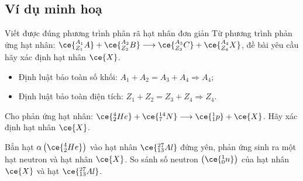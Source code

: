 \subsection{Ví dụ minh hoạ}
\begin{dang}{Viết được đúng phương trình phân rã hạt nhân đơn giản}
Từ phương trình phản ứng hạt nhân: $\ce{^{A_1}_{Z_1}A}+\ce{^{A_2}_{Z_2}B}\longrightarrow\ce{^{A_3}_{Z_3}C}+\ce{^{A_4}_{Z_4}X}$, đề bài yêu cầu hãy xác định hạt nhân $\ce{X}$.
		\begin{itemize}
			\item Định luật bảo toàn số khối: $A_1+A_2=A_3+A_4\Rightarrow A_4$;
			\item Định luật bảo toàn điện tích: $Z_1+Z_2=Z_3+Z_4\Rightarrow Z_4$.
		\end{itemize}
\end{dang}
\begin{vd}
Cho phản ứng hạt nhân: $\ce{^4_2He}+\ce{^{14}_7N}\longrightarrow\ce{^1_1p}+\ce{X}$. Hãy xác định hạt nhân $\ce{X}$.
\end{vd}
\begin{vd}
Bắn hạt $\alpha \left(\ce{^4_2He}\right)$ vào hạt nhân $\ce{^{27}_{13}Al}$ đứng yên, phản ứng sinh ra một hạt neutron và hạt nhân $\ce{X}$. So sánh số neutron $\left(\ce{^1_0n}\right)$ của hạt nhân $\ce{X}$ và hạt $\ce{^{27}_{13}Al}$.
\end{vd}
